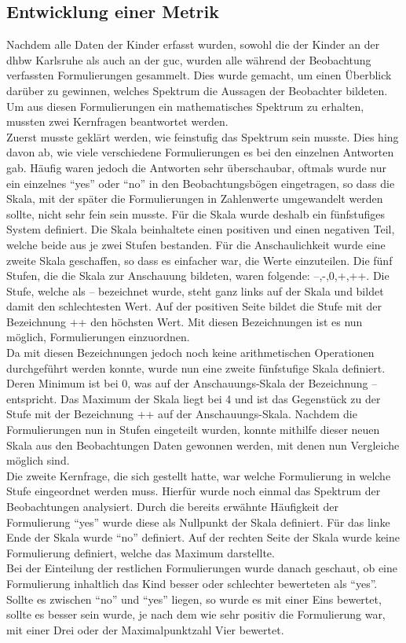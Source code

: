 \subsection{Entwicklung einer Metrik}
Nachdem alle Daten der Kinder erfasst wurden, sowohl die der Kinder an der \acrshort{dhbw} Karlsruhe als auch an der \acrlong{guc}, wurden alle während der Beobachtung verfassten Formulierungen gesammelt. Dies wurde gemacht, um einen Überblick darüber zu gewinnen, welches Spektrum die Aussagen der Beobachter bildeten. Um aus diesen Formulierungen ein mathematisches Spektrum zu erhalten, mussten zwei Kernfragen beantwortet werden.\\
Zuerst musste geklärt werden, wie feinstufig das Spektrum sein musste. Dies hing davon ab, wie viele verschiedene Formulierungen es bei den einzelnen Antworten gab. Häufig waren jedoch die Antworten sehr überschaubar, oftmals wurde nur ein einzelnes "`yes"' oder "`no"' in den Beobachtungsbögen eingetragen, so dass die Skala, mit der später die Formulierungen in Zahlenwerte umgewandelt werden sollte, nicht sehr fein sein musste. Für die Skala wurde deshalb ein fünfstufiges System definiert. Die Skala beinhaltete einen positiven und einen negativen Teil, welche beide aus je zwei Stufen bestanden. Für die Anschaulichkeit wurde eine zweite Skala geschaffen, so dass es einfacher war, die Werte einzuteilen. Die fünf Stufen, die die Skala zur Anschauung bildeten, waren folgende: --,-,0,+,++. Die Stufe, welche als -- bezeichnet wurde, steht ganz links auf der Skala und bildet damit den schlechtesten Wert. Auf der positiven Seite bildet die Stufe mit der Bezeichnung ++ den höchsten Wert. Mit diesen Bezeichnungen ist es nun möglich, Formulierungen einzuordnen.\\
Da mit diesen Bezeichnungen jedoch noch keine arithmetischen Operationen durchgeführt werden konnte, wurde nun eine zweite fünfstufige Skala definiert. Deren Minimum ist bei 0, was auf der Anschauungs-Skala der Bezeichnung -- entspricht. Das Maximum der Skala liegt bei 4 und ist das Gegenstück zu der Stufe mit der Bezeichnung ++ auf der Anschauungs-Skala. Nachdem die Formulierungen nun in Stufen eingeteilt wurden, konnte mithilfe dieser neuen Skala aus den Beobachtungen Daten gewonnen werden, mit denen nun Vergleiche möglich sind.\\

Die zweite Kernfrage, die sich gestellt hatte, war welche Formulierung in welche Stufe eingeordnet werden muss. Hierfür wurde noch einmal das Spektrum der Beobachtungen analysiert. Durch die bereits erwähnte Häufigkeit der Formulierung "`yes"' wurde diese als Nullpunkt der Skala definiert. Für das linke Ende der Skala wurde "`no"' definiert. Auf der rechten Seite der Skala wurde keine Formulierung definiert, welche das Maximum darstellte.\\
Bei der Einteilung der restlichen Formulierungen wurde danach geschaut, ob eine Formulierung inhaltlich das Kind besser oder schlechter bewerteten als "`yes"'. Sollte es zwischen "`no"' und "`yes"' liegen, so wurde es mit einer Eins bewertet, sollte es besser sein wurde, je nach dem wie sehr positiv die Formulierung war, mit einer Drei oder der Maximalpunktzahl Vier bewertet.\\

